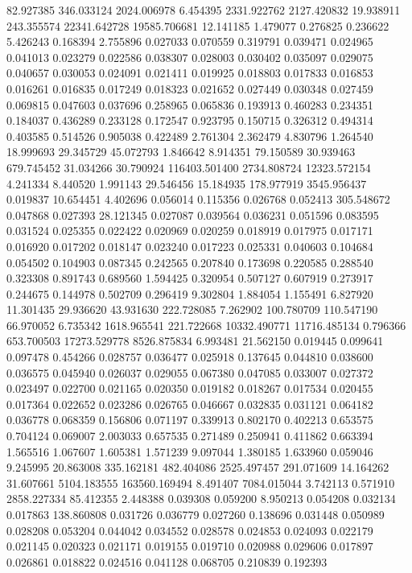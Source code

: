 82.927385
346.033124
2024.006978
6.454395
2331.922762
2127.420832
19.938911
243.355574
22341.642728
19585.706681
12.141185
1.479077
0.276825
0.236622
5.426243
0.168394
2.755896
0.027033
0.070559
0.319791
0.039471
0.024965
0.041013
0.023279
0.022586
0.038307
0.028003
0.030402
0.035097
0.029075
0.040657
0.030053
0.024091
0.021411
0.019925
0.018803
0.017833
0.016853
0.016261
0.016835
0.017249
0.018323
0.021652
0.027449
0.030348
0.027459
0.069815
0.047603
0.037696
0.258965
0.065836
0.193913
0.460283
0.234351
0.184037
0.436289
0.233128
0.172547
0.923795
0.150715
0.326312
0.494314
0.403585
0.514526
0.905038
0.422489
2.761304
2.362479
4.830796
1.264540
18.999693
29.345729
45.072793
1.846642
8.914351
79.150589
30.939463
679.745452
31.034266
30.790924
116403.501400
2734.808724
12323.572154
4.241334
8.440520
1.991143
29.546456
15.184935
178.977919
3545.956437
0.019837
10.654451
4.402696
0.056014
0.115356
0.026768
0.052413
305.548672
0.047868
0.027393
28.121345
0.027087
0.039564
0.036231
0.051596
0.083595
0.031524
0.025355
0.022422
0.020969
0.020259
0.018919
0.017975
0.017171
0.016920
0.017202
0.018147
0.023240
0.017223
0.025331
0.040603
0.104684
0.054502
0.104903
0.087345
0.242565
0.207840
0.173698
0.220585
0.288540
0.323308
0.891743
0.689560
1.594425
0.320954
0.507127
0.607919
0.273917
0.244675
0.144978
0.502709
0.296419
9.302804
1.884054
1.155491
6.827920
11.301435
29.936620
43.931630
222.728085
7.262902
100.780709
110.547190
66.970052
6.735342
1618.965541
221.722668
10332.490771
11716.485134
0.796366
653.700503
17273.529778
8526.875834
6.993481
21.562150
0.019445
0.099641
0.097478
0.454266
0.028757
0.036477
0.025918
0.137645
0.044810
0.038600
0.036575
0.045940
0.026037
0.029055
0.067380
0.047085
0.033007
0.027372
0.023497
0.022700
0.021165
0.020350
0.019182
0.018267
0.017534
0.020455
0.017364
0.022652
0.023286
0.026765
0.046667
0.032835
0.031121
0.064182
0.036778
0.068359
0.156806
0.071197
0.339913
0.802170
0.402213
0.653575
0.704124
0.069007
2.003033
0.657535
0.271489
0.250941
0.411862
0.663394
1.565516
1.067607
1.605381
1.571239
9.097044
1.380185
1.633960
0.059046
9.245995
20.863008
335.162181
482.404086
2525.497457
291.071609
14.164262
31.607661
5104.183555
163560.169494
8.491407
7084.015044
3.742113
0.571910
2858.227334
85.412355
2.448388
0.039308
0.059200
8.950213
0.054208
0.032134
0.017863
138.860808
0.031726
0.036779
0.027260
0.138696
0.031448
0.050989
0.028208
0.053204
0.044042
0.034552
0.028578
0.024853
0.024093
0.022179
0.021145
0.020323
0.021171
0.019155
0.019710
0.020988
0.029606
0.017897
0.026861
0.018822
0.024516
0.041128
0.068705
0.210839
0.192393
